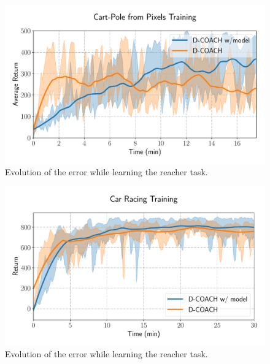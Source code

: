 \begin{figure}[h]
    \centering
    \includegraphics[width=0.9\linewidth]{imagenes/cap3/cartpole_HD_model.pdf}
    \caption{Evolution of the error while learning the reacher task. }
    \label{fig:reacher_exp}
\end{figure}


\begin{figure}[h]
    \centering
    \includegraphics[width=0.9\linewidth]{imagenes/cap3/car_racing_lstm.pdf}
    \caption{Evolution of the error while learning the reacher task. }
    \label{fig:reacher_exp}
\end{figure}